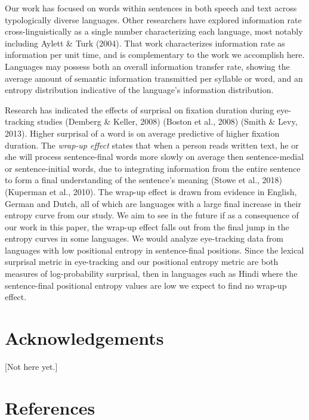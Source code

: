 \documentclass[10pt, letterpaper]{article}
\begin{document}
Our work has focused on words within sentences in both speech and text
across typologically diverse languages. Other researchers have explored
information rate cross-linguistically as a single number characterizing
each language, most notably including Aylett \& Turk (2004). That work
characterizes information rate as information per unit time, and is
complementary to the work we accomplish here. Languages may possess both
an overall information transfer rate, showing the average amount of
semantic information transmitted per syllable or word, and an entropy
distribution indicative of the language's information distribution.

Research has indicated the effects of surprisal on fixation duration
during eye-tracking studies (Demberg \& Keller, 2008) (Boston et al.,
2008) (Smith \& Levy, 2013). Higher surprisal of a word is on average
predictive of higher fixation duration. The \emph{wrap-up effect} states
that when a person reads written text, he or she will process
sentence-final words more slowly on average then sentence-medial or
sentence-initial words, due to integrating information from the entire
sentence to form a final understanding of the sentence's meaning (Stowe
et al., 2018) (Kuperman et al., 2010). The wrap-up effect is drawn from
evidence in English, German and Dutch, all of which are languages with a
large final increase in their entropy curve from our study. We aim to
see in the future if as a consequence of our work in this paper, the
wrap-up effect falls out from the final jump in the entropy curves in
some languages. We would analyze eye-tracking data from languages with
low positional entropy in sentence-final positions. Since the lexical
surprisal metric in eye-tracking and our positional entropy metric are
both measures of log-probability surprisal, then in languages such as
Hindi where the sentence-final positional entropy values are low we
expect to find no wrap-up effect.

\section{Acknowledgements}\label{acknowledgements}

{[}Not here yet.{]}

\section{References}\label{references}

\setlength{\parindent}{-0.1in} \setlength{\leftskip}{0.125in} \noindent
\end{document}
